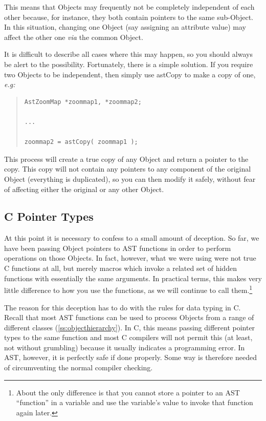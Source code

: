 \documentclass[twoside,11pt]{article}
\newcommand{\htmlref}[2]{#1}
\newcommand{\secref}[1]{\S\ref{#1}}
\renewcommand{\secref}[1]{\ref{#1}}
\begin{document}
This means that Objects may frequently not be completely independent
of each other because, for instance, they both contain pointers to the
same sub-Object. In this situation, changing one Object (say assigning
an attribute value) may affect the other one {\em{via}} the common
Object.

It is difficult to describe all cases where this may happen, so you
should always be alert to the possibility. Fortunately, there is a
simple solution. If you require two Objects to be independent, then
simply use \htmlref{astCopy}{astCopy} to make a copy of one, {\em{e.g:}}

\begin{quote}
\small
\begin{verbatim}
AstZoomMap *zoommap1, *zoommap2;

...

zoommap2 = astCopy( zoommap1 );
\end{verbatim}
\normalsize
\end{quote}

This process will create a true copy of any Object and return a
pointer to the copy. This copy will not contain any pointers to any
component of the original Object (everything is duplicated), so you
can then modify it safely, without fear of affecting either the
original or any other Object.


\subsection{C Pointer Types}

At this point it is necessary to confess to a small amount of
deception. So far, we have been passing \htmlref{Object}{Object} pointers to AST
functions in order to perform operations on those Objects. In fact,
however, what we were using were not true C functions at all, but
merely macros which invoke a related set of hidden functions with
essentially the same arguments. In practical terms, this makes very
little difference to how you use the functions, as we will continue to
call them.\footnote{About the only difference is that you cannot store
a pointer to an AST ``function'' in a variable and use the variable's
value to invoke that function again later.}

The reason for this deception has to do with the rules for data typing
in C. Recall that most AST functions can be used to process Objects
from a range of different classes (\secref{ss:objecthierarchy}). In C,
this means passing different pointer types to the same function and
most C compilers will not permit this (at least, not without
grumbling) because it usually indicates a programming error. In AST,
however, it is perfectly safe if done properly. Some way is therefore
needed of circumventing the normal compiler checking.
\end{document}
